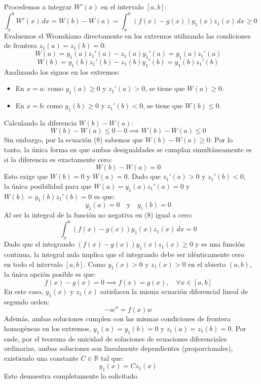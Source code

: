 \documentclass[12pt,letterpaper]{article}
\begin{document}
\medskip
Procedemos a integrar $W'(x)$ en el intervalo $[a, b]$:
\begin{equation}
  \int_a^b W'(x) \, dx = W(b) - W(a) = \int_a^b (f(x) - g(x)) y_1(x) z_1(x) \, dx \ge 0
\end{equation}
Evaluemos el Wronskiano directamente en los extremos utilizando las condiciones de frontera $z_1(a) = z_1(b) = 0$:
\[
  W(a) = y_1(a) z_1'(a) - z_1(a) y_1'(a) = y_1(a) z_1'(a)
\]
\[
  W(b) = y_1(b) z_1'(b) - z_1(b) y_1'(b) = y_1(b) z_1'(b)
\]
Analizando los signos en los extremos:
\begin{itemize}
  \item En $x = a$: como $y_1(a) \ge 0$ y $z_1'(a) > 0$, se tiene que $W(a) \ge 0$.
  \item En $x = b$: como $y_1(b) \ge 0$ y $z_1'(b) < 0$, se tiene que $W(b) \le 0$.
\end{itemize}
Calculando la diferencia $W(b) - W(a)$:
\[
  W(b) - W(a) \le 0 - 0 \implies W(b) - W(a) \le 0
\]
Sin embargo, por la ecuación (8) sabemos que $W(b) - W(a) \ge 0$. Por lo tanto, la única forma en que ambas desigualdades se cumplan simultáneamente es si la diferencia es exactamente cero:
\[
  W(b) - W(a) = 0
\]
Esto exige que $W(b) = 0$ y $W(a) = 0$.
Dado que $z_1'(a) > 0$ y $z_1'(b) < 0$, la única posibilidad para que $W(a) = y_1(a) z_1'(a) = 0$ y $W(b) = y_1(b) z_1'(b) = 0$ es que:
\[
  y_1(a) = 0 \quad \text{y} \quad y_1(b) = 0
\]
Al ser la integral de la función no negativa en (8) igual a cero:
\[
  \int_a^b (f(x) - g(x)) y_1(x) z_1(x) \, dx = 0
\]
Dado que el integrando $(f(x) - g(x))y_1(x)z_1(x) \ge 0$ y es una función continua, la integral nula implica que el integrando debe ser idénticamente cero en todo el intervalo $[a, b]$. Como $y_1(x) > 0$ y $z_1(x) > 0$ en el abierto $(a, b)$, la única opción posible es que:
\[
  f(x) - g(x) = 0 \implies f(x) = g(x), \quad \forall x \in [a, b]
\]
En este caso, $y_1(x)$ y $z_1(x)$ satisfacen la misma ecuación diferencial lineal de segundo orden:
\[
  -w'' = f(x) w
\]
Además, ambas soluciones cumplen con las mismas condiciones de frontera homogéneas en los extremos, $y_1(a) = y_1(b) = 0$ y $z_1(a) = z_1(b) = 0$. Por ende, por el teorema de unicidad de soluciones de ecuaciones diferenciales ordinarias, ambas soluciones son linealmente dependientes (proporcionales), existiendo una constante $C \in \mathbb{R}$ tal que:
\[
  y_1(x) = C z_1(x)
\]
Esto demuestra completamente lo solicitado.
\end{document}
